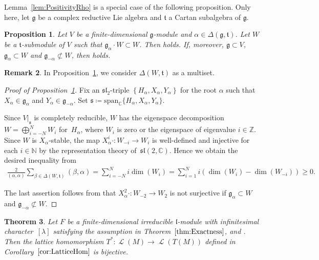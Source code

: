 \documentclass[pdftex]{sigma}
\numberwithin{equation}{section}
\newtheorem{Theorem}{Theorem}[section]
\newtheorem{Proposition}[Theorem]{Proposition}
\theoremstyle{definition}
\newtheorem{Remark}[Theorem]{Remark}
\newcommand{\spn}[1]{\mathrm{span}_{\CC}\{#1\}}
\newcommand{\set}[1]{\left\{#1 \right\}}
\newcommand{\BasicRing}[1]{\mathbb{#1}}
\newcommand{\ZZ}{\BasicRing{Z}}
\newcommand{\NN}{\BasicRing{N}}
\newcommand{\CC}{\BasicRing{C}}
\newcommand{\lie}[1]{\mathfrak{#1}}
\newcommand{\BGGcat}[2]{\mathcal{O}_{\lie{#2}}^{\lie{#1}}}
\DeclareMathOperator{\lattice}{\mathcal{L}}
\begin{document}
Lemma~\ref{lem:PositivityRho} is a special case of the following proposition.
Only here, let $\lie{g}$ be a complex reductive Lie algebra and $\lie{t}$ a Cartan subalgebra of $\lie{g}$.

\begin{Proposition}\label{prop:PositivityRho}
	Let $V$ be a finite-dimensional $\lie{g}$-module and $\alpha \in \Delta(\lie{g}, \lie{t})$.
	Let $W$ be a $\lie{t}$-submodule of $V$ such that $\lie{g}_{\alpha} \cdot W \subset W$.
	Then \smash{$\sum_{\beta \in \Delta(W, \lie{t})}(\beta, \alpha) \geq 0$} holds.
	If, moreover, $\lie{g}\subset V$, $\lie{g}_{\alpha} \subset W$ and $\lie{g}_{-\alpha} \not\subset W$,
	then \smash{$\sum_{\beta \in \Delta(W, \lie{t})}(\beta, \alpha) > 0$} holds.
\end{Proposition}

\begin{Remark}
	In Proposition~\ref{prop:PositivityRho}, we consider $\Delta(W, \lie{t})$ as a multiset.
\end{Remark}
	
\begin{proof}[Proof of Proposition~\ref{prop:PositivityRho}]
	Fix an $\lie{sl}_2$-triple $\set{H_\alpha, X_\alpha, Y_\alpha}$ for the root $\alpha$ such that $X_\alpha \in \lie{g}_{\alpha}$ and $Y_\alpha \in \lie{g}_{-\alpha}$.
	Set $\lie{s}\coloneq \spn{H_\alpha, X_\alpha, Y_\alpha}$.

	Since $V|_{\lie{s}}$ is completely reducible, $W$ has the eigenspace decomposition
	$W = \bigoplus_{i = -N}^N W_i$ for~$H_\alpha$, where $W_i$ is zero or the eigenspace of eigenvalue $i \in \ZZ$.
	Since $W$ is $X_\alpha$-stable, the map $X_\alpha^i\cdot \colon W_{-i} \rightarrow W_{i}$
	is well-defined and injective for each $i \in \NN$ by the representation theory of~$\lie{sl}(2,\CC)$.
	Hence we obtain the desired inequality from
	\begin{align*}
		\frac{2}{(\alpha, \alpha)} \sum_{\beta \in \Delta(W, \lie{t})} (\beta, \alpha) = \sum_{i=-N}^N i\dim(W_i)
	 = \sum_{i=1}^N i(\dim(W_i) - \dim(W_{-i})) \geq 0.
	\end{align*}
	
	The last assertion follows from that $X_\alpha^2\cdot \colon W_{-2} \rightarrow W_{2}$ is not surjective
	if $\lie{g}_{\alpha} \subset W$ and $\lie{g}_{-\alpha} \not\subset W$.
\end{proof}

\begin{Theorem}\label{thm:ReductionToScalar}
	Let $F$ be a finite-dimensional irreducible $\lie{l}$-module with infinitesimal character~$[\lambda]$ satisfying the assumption in Theorem~$\ref{thm:Exactness}$,
	and \smash{$M \in \BGGcat{g'}{q'}(F)$}.
	Then the lattice homomorphism $T^*\colon \lattice(M) \rightarrow \lattice(T(M))$ defined in Corollary~$\ref{cor:LatticeHom}$ is bijective.
\end{Theorem}
\end{document}
